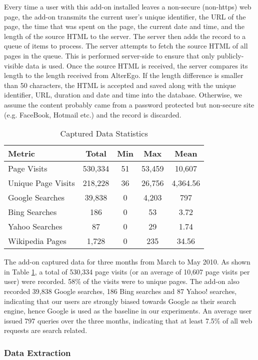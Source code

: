 \documentclass{sig-alternate}
\begin{document}
Every time a user with this add-on installed leaves a non-secure (non-https) web page, the add-on transmits the current user's unique identifier, the URL of the page, the time that was spent on the page, the current date and time, and the length of the source HTML to the server. The server then adds the record to a queue of items to process. The server attempts to fetch the source HTML of all pages in the queue. This is performed server-side to ensure that only publicly-visible data is used. Once the source HTML is received, the server compares its length to the length received from AlterEgo. If the length difference is smaller than 50 characters, the HTML is accepted and saved along with the unique identifier, URL, duration and date and time into the database. Otherwise,  we assume the content probably came from a password protected but non-secure site (e.g. FaceBook, Hotmail etc.) and the record is discarded.

\begin{table}
\centering
\caption{Captured Data Statistics}
\begin{tabular}{|l|c|c|c|c|} \hline
\textbf{Metric}&\textbf{Total}&\textbf{Min}&\textbf{Max}&\textbf{Mean}\\ \hline
Page Visits&530,334&51&53,459&10,607\\ \hline
Unique Page Visits&218,228&36&26,756&4,364.56\\ \hline
Google Searches&39,838&0&4,203&797\\ \hline
Bing Searches&186&0&53&3.72\\ \hline
Yahoo Searches&87&0&29&1.74\\ \hline
Wikipedia Pages&1,728&0&235&34.56\\
\hline\end{tabular}
\label{tab:stats}
\end{table}

The add-on captured data for three months from March to May 2010. As shown in Table \ref{tab:stats}, a total of 530,334 page visits (or an average of 10,607 page visits per user) were recorded. 58\% of the visits were to unique pages. The add-on also recorded 39,838 Google searches, 186 Bing searches and 87 Yahoo! searches, indicating that our users are strongly biased towards Google as their search engine, hence Google is used as the baseline in our experiments. An average user issued 797 queries over the three months, indicating that at least 7.5\% of all web requests are search related.

\subsubsection{Data Extraction}
\end{document}
